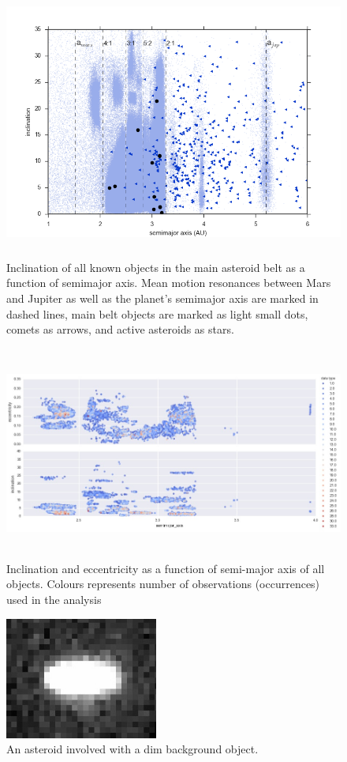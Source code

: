 \documentclass[iop,apj]{emulateapj}
\begin{document}
\begin{figure}[!htb]
    \centering
    \includegraphics[height=9cm]{graphs/aa_comets_mba_all.png}
    \caption{Inclination of all known objects in the main asteroid belt as a function of semimajor axis.  Mean motion resonances between Mars and Jupiter as well as the planet's semimajor axis are marked in dashed lines, main belt objects are marked as light small dots, comets as arrows, and active asteroids as stars. \cite{mpc}}\label{fig:1}
\end{figure}

\begin{figure}[!htb]
    \centering
    \includegraphics[height=7cm]{graphs/a_e_i_occur.png}
    \caption{Inclination and eccentricity as a function of semi-major axis of all objects. Colours represents number of observations (occurrences) used in the analysis}\label{fig:2}
\end{figure}

\begin{figure}[!htb]
    \centering
    \includegraphics[height=4cm]{images/background_gal.jpeg}
    \caption{An asteroid involved with a dim background object. }\label{fig:3}
\end{figure}
\end{document}
